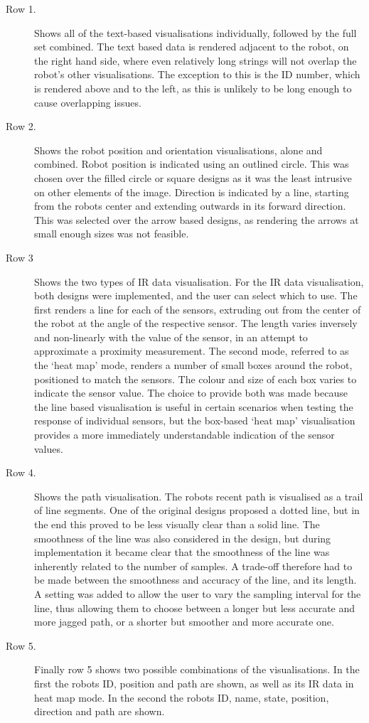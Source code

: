 \begin{description}
\item [Row 1.] Shows all of the text-based visualisations individually, followed by the full set combined. The text based data is rendered adjacent to the robot, on the right hand side, where even relatively long strings will not overlap the robot's other visualisations. The exception to this is the ID number, which is rendered above and to the left, as this is unlikely to be long enough to cause overlapping issues.  

\item [Row 2.] Shows the robot position and orientation visualisations, alone and combined. Robot position is indicated using an outlined circle. This was chosen over the filled circle or square designs as it was the least intrusive on other elements of the image. Direction is indicated by a line, starting from the robots center and extending outwards in its forward direction. This was selected over the arrow based designs, as rendering the arrows at small enough sizes was not feasible.

\item [Row 3] Shows the two types of IR data visualisation. For the IR data visualisation, both designs were implemented, and the user can select which to use. The first renders a line for each of the sensors, extruding out from the center of the robot at the angle of the respective sensor. The length varies inversely and non-linearly with the value of the sensor, in an attempt to approximate a proximity measurement. The second mode, referred to as the `heat map' mode, renders a number of small boxes around the robot, positioned to match the sensors. The colour and size of each box varies to indicate the sensor value. The choice to provide both was made because the line based visualisation is useful in certain scenarios when testing the response of individual sensors, but the box-based `heat map' visualisation provides a more immediately understandable indication of the sensor values.  

\item [Row 4.] Shows the path visualisation. The robots recent path is visualised as a trail of line segments. One of the original designs proposed a dotted line, but in the end this proved to be less visually clear than a solid line. The smoothness of the line was also considered in the design, but during implementation it became clear that the smoothness of the line was inherently related to the number of samples. A trade-off therefore had to be made between the smoothness and accuracy of the line, and its length. A setting was added to allow the user to vary the sampling interval for the line, thus allowing them to choose between a longer but less accurate and more jagged path, or a shorter but smoother and more accurate one.

\item [Row 5.] Finally row 5 shows two possible combinations of the visualisations. In the first the robots ID, position and path are shown, as well as its IR data in heat map mode. In the second the robots ID, name, state, position, direction and path are shown.
\end{description}

